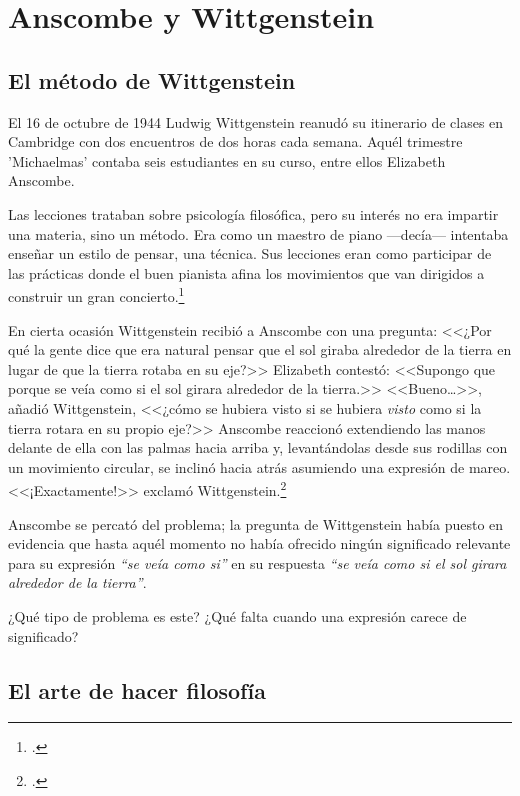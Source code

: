 \section{Anscombe y Wittgenstein}

\subsection{El método de Wittgenstein}
El 16 de octubre de 1944 Ludwig Wittgenstein reanudó su itinerario de clases en
Cambridge con dos encuentros de dos horas cada semana. Aquél trimestre
'Michaelmas' contaba seis estudiantes en su curso, entre ellos Elizabeth
Anscombe. 

Las lecciones trataban sobre psicología filosófica, pero su interés no era
impartir una materia, sino un método. Era como un maestro de piano ---decía---
intentaba enseñar un estilo de pensar, una técnica. Sus lecciones eran como
participar de las prácticas donde el buen pianista afina los movimientos que van
dirigidos a construir un gran concierto.\footcite[p.~357]{pubnpriv}

En cierta ocasión Wittgenstein recibió a Anscombe con una pregunta: <<¿Por qué
la gente dice que era natural pensar que el sol giraba alrededor de la tierra en
lugar de que la tierra rotaba en su eje?>> Elizabeth contestó: <<Supongo que
porque se veía como si el sol girara alrededor de la tierra.>> <<Bueno\ldots>>,
añadió Wittgenstein, <<¿cómo se hubiera visto si se hubiera \emph{visto} como si
la tierra rotara en su propio eje?>> Anscombe reaccionó extendiendo las manos
delante de ella con las palmas hacia arriba y, levantándolas desde sus rodillas
con un movimiento circular, se inclinó hacia atrás asumiendo una expresión de
mareo. <<¡Exactamente!>> exclamó Wittgenstein.\footcite[cf.~][p.~151]{IWT}

Anscombe se percató del problema; la pregunta de Wittgenstein había puesto en
evidencia que hasta aquél momento no había ofrecido ningún significado relevante
para su expresión \emph{``se veía como si''} en su respuesta \emph{``se veía
  como si el sol girara alrededor de la tierra''}.

¿Qué tipo de problema es este? ¿Qué falta cuando una expresión carece de
significado?

\subsection{El arte de hacer filosofía}

